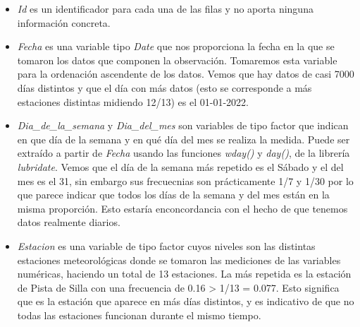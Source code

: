 \documentclass[notspecified,article,submit,moreauthors,pdftex]{Definitions/mdpi}
\newenvironment{Shaded}{\begin{snugshade}}{\end{snugshade}}
\newcommand{\FunctionTok}[1]{\textcolor[rgb]{0.13,0.29,0.53}{\textbf{#1}}}
\newcommand{\NormalTok}[1]{#1}
\newcommand{\OtherTok}[1]{\textcolor[rgb]{0.56,0.35,0.01}{#1}}
\newcommand{\SpecialCharTok}[1]{\textcolor[rgb]{0.81,0.36,0.00}{\textbf{#1}}}
\begin{document}
\begin{itemize}
\item
  \emph{Id} es un identificador para cada una de las filas y no aporta
  ninguna información concreta.
\item
  \emph{Fecha} es una variable tipo \emph{Date} que nos proporciona la
  fecha en la que se tomaron los datos que componen la observación.
  Tomaremos esta variable para la ordenación ascendente de los datos.
  Vemos que hay datos de casi 7000 días distintos y que el día con más
  datos (esto se corresponde a más estaciones distintas midiendo 12/13)
  es el 01-01-2022.
\end{itemize}

\begin{Shaded}
\end{Shaded}

\begin{itemize}
\item
  \emph{Dia\_de\_la\_semana} y \emph{Dia\_del\_mes} son variables de
  tipo factor que indican en que día de la semana y en qué día del mes
  se realiza la medida. Puede ser extraído a partir de \emph{Fecha}
  usando las funciones \emph{wday()} y \emph{day()}, de la librería
  \emph{lubridate}. Vemos que el día de la semana más repetido es el
  Sábado y el del mes es el 31, sin embargo sus frecuecnias son
  prácticamente 1/7 y 1/30 por lo que parece indicar que todos los días
  de la semana y del mes están en la misma proporción. Esto estaría
  enconcordancia con el hecho de que tenemos datos realmente diarios.
\item
  \emph{Estacion} es una variable de tipo factor cuyos niveles son las
  distintas estaciones meteorológicas donde se tomaron las mediciones de
  las variables numéricas, haciendo un total de 13 estaciones. La más
  repetida es la estación de Pista de Silla con una frecuencia de 0.16
  \textgreater{} 1/13 = 0.077. Esto significa que es la estación que
  aparece en más días distintos, y es indicativo de que no todas las
  estaciones funcionan durante el mismo tiempo.
\end{itemize}

\begin{Shaded}
\end{Shaded}
\end{document}
